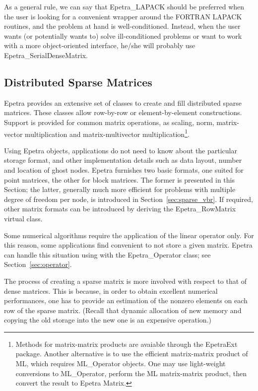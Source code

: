 As a general rule, we can say that Epetra\_LAPACK should be preferred
when the user is looking for a convenient wrapper around the FORTRAN
LAPACK routines, and the problem at hand is well-conditioned. Instead,
when the user wants (or potentially wants to) solve ill-conditioned
problems or want to work with a more object-oriented interface, he/she
will probably use Epetra\_SerialDenseMatrix.


\subsection{Distributed Sparse Matrices}
\label{sec:sparse_mat}

Epetra provides an extensive set of classes to create and fill
distributed sparse matrices. These classes allow row-by-row or
element-by-element constructions. Support is provided for common matrix
operations, as scaling, norm, matrix-vector multiplication and
matrix-multivector multiplication\footnote{Methods for matrix-matrix
  products are avaiable through the EpetraExt package. Another
  alternative is to use the efficient matrix-matrix product of ML, which
  requires ML\_Operator objects. One may use light-weight conversions to
  ML\_Operator, perform the ML matrix-matrix product, then convert the
  result to Epetra Matrix.}.

Using Epetra objects, applications do not need to know about the
particular storage format, and other implementation details such as data
layout, number and location of ghost nodes. Epetra furnishes two basic
formats, one suited for point matrices, the other for block matrices.
The former is presented in this Section; the latter, generally much more
efficient for problems with multiple degree of freedom per node, is
introduced in Section~\ref{sec:sparse_vbr}. If required, other matrix
formats can be introduced by deriving the Epetra\_RowMatrix virtual
class.

\begin{remark}
Some numerical algorithms require  the application of the linear
operator only. For this reason, some applications find convenient to not
store a given matrix. Epetra can handle this situation using with the
Epetra\_Operator class; see Section~\ref{sec:operator}.
\end{remark}

The process of creating a sparse matrix is more involved with respect to
that of dense matrices. This is because, in order to obtain excellent
numerical performances, one has to provide an estimation of the nonzero
elements on each row of the sparse matrix. (Recall that dynamic
allocation of new memory and copying the old storage into the new one is
an expensive operation.) 


